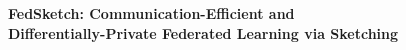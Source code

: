 \documentclass[article]{article}
\begin{document}
\begin{center}

{\bf{\LARGE{FedSketch: Communication-Efficient and \\
\vspace*{.2in}
Differentially-Private Federated Learning via Sketching}}}
\vspace*{.2in}

{{
}}


\vspace*{.2in}



{\large{
\begin{tabular}{c}
\end{tabular}
}}

\begin{tabular}{c}
\end{tabular}

\vspace*{.2in}


\date{\today}

\end{center}
\end{document}
